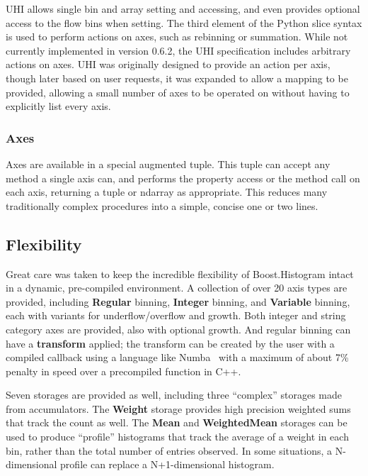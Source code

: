 \documentclass{webofc}
\begin{document}
UHI allows single bin and array setting and accessing, and even provides optional access to the flow bins when setting. The third element of the Python slice syntax is used to perform actions on axes, such as rebinning or summation. While not currently implemented in version 0.6.2, the UHI specification includes arbitrary actions on axes. UHI was originally designed to provide an action per axis, though later based on user requests, it was expanded to allow a mapping to be provided, allowing a small number of axes to be operated on without having to explicitly list every axis.

\subsubsection{Axes}
\label{sec-bhp-axes}

Axes are available in a special augmented tuple. This tuple can accept any method a single axis can, and performs the property access or the method call on each axis, returning a tuple or ndarray as appropriate. This reduces many traditionally complex procedures into a simple, concise one or two lines.

\subsection{Flexibility}

Great care was taken to keep the incredible flexibility of Boost.Histogram intact in a dynamic, pre-compiled environment. A collection of over 20 axis types are provided, including \textbf{Regular} binning, \textbf{Integer} binning, and \textbf{Variable} binning, each with variants for underflow/overflow and growth. Both integer and string category axes are provided, also with optional growth. And regular binning can have a \textbf{transform} applied; the transform can be created by the user with a compiled callback using a language like Numba~\cite{lam2015numba} with a maximum of about 7\% penalty in speed over a precompiled function in C++.

Seven storages are provided as well, including three ``complex'' storages made from accumulators. The \textbf{Weight} storage provides high precision weighted sums that track the count as well. The \textbf{Mean} and \textbf{WeightedMean} storages can be used to produce ``profile'' histograms that track the average of a weight in each bin, rather than the total number of entries observed. In some situations, a N-dimensional profile can replace a N+1-dimensional histogram.
\end{document}
